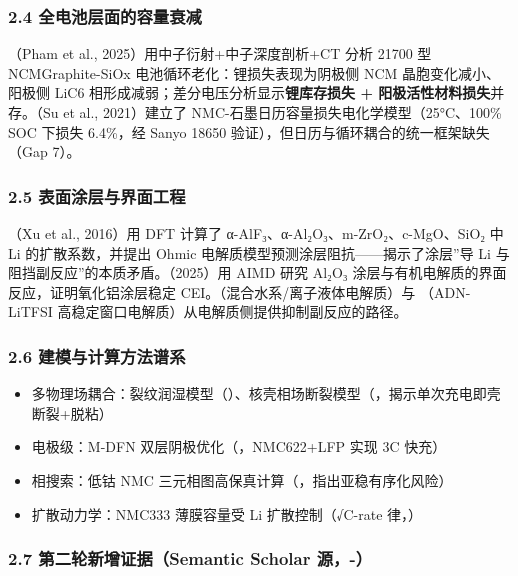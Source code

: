 \documentclass[12pt,a4paper]{ctexart}
\providecommand{\tightlist}{%
  \setlength{\itemsep}{0pt}\setlength{\parskip}{0pt}}
\begin{document}
\subsubsection{2.4 全电池层面的容量衰减}\label{ux5168ux7535ux6c60ux5c42ux9762ux7684ux5bb9ux91cfux8870ux51cf}

\cite{p28}（Pham et al., 2025）用中子衍射+中子深度剖析+CT 分析 21700 型 NCM\textbar\textbar Graphite-SiOx 电池循环老化：锂损失表现为阴极侧 NCM 晶胞变化减小、阳极侧 LiC6 相形成减弱；差分电压分析显示\textbf{锂库存损失 + 阳极活性材料损失}并存。\cite{p16}（Su et al., 2021）建立了 NMC-石墨日历容量损失电化学模型（25°C、100\% SOC 下损失 6.4\%，经 Sanyo 18650 验证），但日历与循环耦合的统一框架缺失（Gap 7）。

\subsubsection{2.5 表面涂层与界面工程}\label{ux8868ux9762ux6d82ux5c42ux4e0eux754cux9762ux5de5ux7a0b}

\cite{p42}（Xu et al., 2016）用 DFT 计算了 α-AlF₃、α-Al₂O₃、m-ZrO₂、c-MgO、SiO₂ 中 Li 的扩散系数，并提出 Ohmic 电解质模型预测涂层阻抗------揭示了涂层''导 Li 与阻挡副反应''的本质矛盾。\cite{p39}（2025）用 AIMD 研究 Al₂O₃ 涂层与有机电解质的界面反应，证明氧化铝涂层稳定 CEI。\cite{p12}（混合水系/离子液体电解质）与 \cite{p14}（ADN-LiTFSI 高稳定窗口电解质）从电解质侧提供抑制副反应的路径。

\subsubsection{2.6 建模与计算方法谱系}\label{ux5efaux6a21ux4e0eux8ba1ux7b97ux65b9ux6cd5ux8c31ux7cfb}

\begin{itemize}
\tightlist
\item
  多物理场耦合：裂纹润湿模型（\cite{p31}）、核壳相场断裂模型（\cite{p33}，揭示单次充电即壳断裂+脱粘）
\item
  电极级：M-DFN 双层阴极优化（\cite{p29}，NMC622+LFP 实现 3C 快充）
\item
  相搜索：低钴 NMC 三元相图高保真计算（\cite{p22}，指出亚稳有序化风险）
\item
  扩散动力学：NMC333 薄膜容量受 Li 扩散控制（√C-rate 律，\cite{p35}）
\end{itemize}

\subsubsection{2.7 第二轮新增证据（Semantic Scholar 源，\cite{p43}-\cite{p50}）}\label{ux7b2cux4e8cux8f6eux65b0ux589eux8bc1ux636esemantic-scholar-ux6e90p43-p50}
\end{document}
